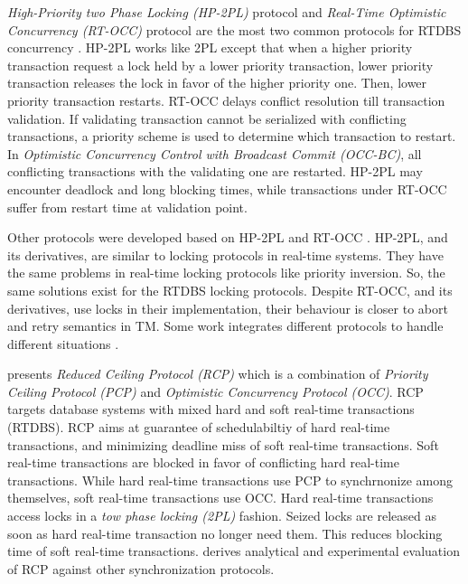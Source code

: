 \textit{High-Priority two Phase Locking (HP-2PL)} protocol \cite{lam1997concurrency,259432,5532682,1541104}
and \textit{Real-Time Optimistic Concurrency (RT-OCC)} protocol \cite{lam1997concurrency,1401009,859541,259432,1541104,495222}
are the most two common protocols for RTDBS concurrency . HP-2PL works
like 2PL except that when a higher priority transaction request a
lock held by a lower priority transaction, lower priority transaction
releases the lock in favor of the higher priority one. Then, lower
priority transaction restarts. RT-OCC delays conflict resolution till
transaction validation. If validating transaction cannot be serialized
with conflicting transactions, a priority scheme is used to determine
which transaction to restart. In \textit{Optimistic Concurrency Control
with Broadcast Commit (OCC-BC)}, all conflicting transactions with
the validating one are restarted. HP-2PL may encounter deadlock and
long blocking times, while transactions under RT-OCC suffer from restart
time at validation point.

Other protocols were developed based on HP-2PL \cite{lam1997concurrency,5532682,1541104}
and RT-OCC \cite{lam1997concurrency,1401009,4680843,495222}. HP-2PL,
and its derivatives, are similar to locking protocols in real-time
systems. They have the same problems in real-time locking protocols
like priority inversion. So, the same solutions exist for the RTDBS
locking protocols. Despite RT-OCC, and its derivatives, use locks
in their implementation, their behaviour is closer to abort and retry
semantics in TM. Some work integrates different protocols to handle
different situations \cite{853991,5532682}.

\cite{lam1997concurrency} presents \textit{Reduced Ceiling Protocol
(RCP)} which is a combination of \textit{Priority Ceiling Protocol
(PCP)} and \textit{Optimistic Concurrency Protocol (OCC)}. RCP targets
database systems with mixed hard and soft real-time transactions (RTDBS).
RCP aims at guarantee of schedulabiltiy of hard real-time transactions,
and minimizing deadline miss of soft real-time transactions. Soft
real-time transactions are blocked in favor of conflicting hard real-time
transactions. While hard real-time transactions use PCP to synchrnonize
among themselves, soft real-time transactions use OCC. Hard real-time
transactions access locks in a \textit{tow phase locking (2PL)} fashion.
Seized locks are released as soon as hard real-time transaction no
longer need them. This reduces blocking time of soft real-time transactions.
\cite{lam1997concurrency} derives analytical and experimental evaluation
of RCP against other synchronization protocols.

